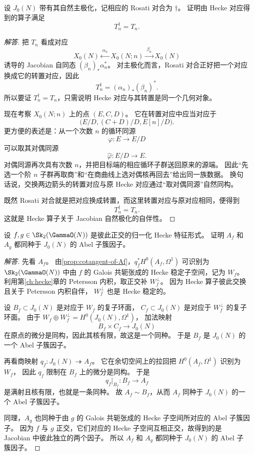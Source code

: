 \begin{exercise}
\label{ex:rosati-selfadjoint-hecke}
设 $J_0(N)$ 带有其自然主极化，记相应的 Rosati 对合为 $\dagger$。
证明由 Hecke 对应得到的算子满足
\[
  T_n^{\dagger}=T_n.
\]
\end{exercise}

\begin{proof}[解答]
把 $T_n$ 看成对应
\[
  X_0(N) \xleftarrow{\ \alpha_n\ } X_0(N;n) \xrightarrow{\ \beta_n\ } X_0(N)
\]
诱导的 Jacobian 自同态 $(\beta_n)_*\alpha_n^*$。
对主极化而言，Rosati 对合正好把一个对应换成它的转置对应，因此
\[
  T_n^{\dagger}=(\alpha_n)_*(\beta_n)^*.
\]
所以要证 $T_n^{\dagger}=T_n$，只需说明 Hecke 对应与其转置是同一个几何对象。

现在考察 $X_0(N;n)$ 上的点 $(E,C,D)$。
它在转置对应中应当对应于
\[
  \bigl(E/D,(C+D)/D,E[n]/D\bigr).
\]
更方便的表述是：从一个次数 $n$ 的循环同源
\[
  \varphi:E\to E/D
\]
可以取其对偶同源
\[
  \widehat{\varphi}:E/D\to E.
\]
对偶同源再次具有次数 $n$，并把目标端的相应循环子群送回原来的源端。
因此“先选一个阶 $n$ 子群再取商”和“在商曲线上选对偶核再回去”给出同一族数据。
换句话说，交换两边箭头的转置对应与原 Hecke 对应通过“取对偶同源”自然同构。

既然 Rosati 对合就是把对应换成转置，而这里转置对应与原对应相同，便得到
\[
  T_n^{\dagger}=T_n.
\]
这就是 Hecke 算子关于 Jacobian 自然极化的自伴性。
\end{proof}

\begin{exercise}
\label{ex:Af-Ag-factors}
设 $f,g\in \Sk_2(\GammaO(N))$ 是彼此正交的归一化 Hecke 特征形式。
证明 $A_f$ 和 $A_g$ 都同种于 $J_0(N)$ 的 Abel 子簇因子。
\end{exercise}

\begin{proof}[解答]
先看 $A_f$。
由\cref{prop:cotangent-of-Af}，$q_f^*H^0(A_f,\Omega^1)$ 可识别为
$\Sk_2(\GammaO(N))$ 中由 $f$ 的 Galois 共轭张成的 Hecke 稳定子空间，记为 $W_f$。
利用第\ref{ch:hecke}章的 Petersson 内积，取正交补 $W_f^{\perp}$。
因为 Hecke 算子彼此交换且关于 Petersson 内积自伴，
$W_f^{\perp}$ 也是 Hecke 稳定的。

设 $B_f\subset J_0(N)$ 是对应于 $W_f$ 的复子环面，
$C_f\subset J_0(N)$ 是对应于 $W_f^{\perp}$ 的复子环面。
由于 $W_f\oplus W_f^{\perp}=H^0(J_0(N),\Omega^1)$，
加法映射
\[
  B_f\times C_f\longrightarrow J_0(N)
\]
在原点的微分是同构，因此其核有限，故这是一个同种。
于是 $B_f$ 是 $J_0(N)$ 的一个 Abel 子簇因子。

再看商映射 $q_f:J_0(N)\twoheadrightarrow A_f$。
它在余切空间上的拉回把 $H^0(A_f,\Omega^1)$ 识别为 $W_f$，
因此 $q_f$ 限制在 $B_f$ 上的微分是同构。
于是
\[
  q_f|_{B_f}:B_f\longrightarrow A_f
\]
是满射且核有限，也就是一条同种。
故 $A_f\sim B_f$，从而 $A_f$ 同种于 $J_0(N)$ 的一个 Abel 子簇因子。

同理，$A_g$ 也同种于由 $g$ 的 Galois 共轭张成的 Hecke 子空间所对应的 Abel 子簇因子。
因为 $f$ 与 $g$ 正交，它们对应的 Hecke 子空间互相正交，故得到的是 Jacobian 中彼此独立的两个因子。
所以 $A_f$ 和 $A_g$ 都同种于 $J_0(N)$ 的 Abel 子簇因子。
\end{proof}

